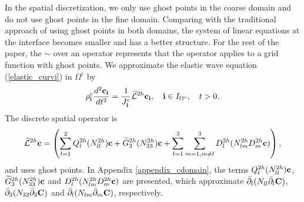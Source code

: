 In the spatial discretization, we only use ghost points in the coarse domain and do not use ghost points in the fine domain. Comparing with the traditional approach of using ghost points in both domains, the system of linear equations at the interface becomes smaller and has a better structure. For the rest of the paper, the $\sim$ over an operator represents that the operator applies to a grid function with ghost points. We approximate the elastic wave equation (\ref{elastic_curvi}) in $\Omega^c$ by
\begin{equation}\label{elastic_semi_c}
{\rho}_{\bf i}^{c}\frac{d^2{{\bf c}_{\bf i}}}{dt^2} = \frac{1}{J^c_{\bf i}}\wt{\mathcal{L}}^{2h} {{\bf c}}_{\bf i},\quad {\bf i}\in I_{\Omega^c},\quad t>0.
\end{equation}
The discrete spatial operator is
\begin{equation}\label{L_operator}
\wt{\mathcal{L}}^{2h} {{\bf c}} = \left(\sum_{l=1}^2{Q}_l^{2h}({N}_{ll}^{2h}){\bf c}+\wt{{G}}_3^{2h}({N}_{33}^{2h}){{\bf c}}+\sum_{l=1}^3\sum_{m=1,m\neq l}^3{D}_l^{2h}({N}_{lm}^{2h}{D}_m^{2h}{\bf c})\right),
\end{equation}
and uses ghost points. %
In Appendix \ref{appendix_cdomain}, the terms $Q_l^{2h}(N_{ll}^{2h}){\bf c}$, $\widetilde{G}_3^{2h}(N_{33}^{2h}){\bf c}$ and $D_{l}^{2h}(N_{lm}^{2h}D_m^{2h}{\bf c})$ are presented, which approximate $\bar{\partial}_l(N_{ll}\bar{\partial}_l{\bf C})$, $\bar{\partial}_3(N_{33}\bar{\partial}_3 {\bf C})$ and $\bar{\partial}_l(N_{lm}\bar{\partial}_m {\bf C})$, respectively.

